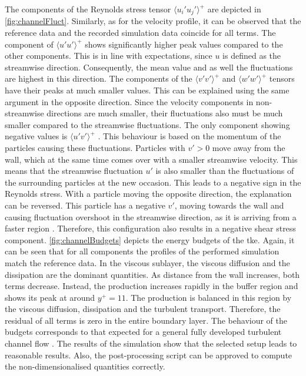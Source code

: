 The components of the Reynolds stress tensor $\langle u_i'u_j'\rangle ^+$ are depicted in \autoref{fig:channelFluct}.
Similarly, as for the velocity profile, it can be observed that the reference data and the recorded simulation data coincide for all terms.
The component of $\langle u'u'\rangle ^+$ shows significantly higher peak values compared to the other components.
This is in line with expectations, since $u$ is defined as the streamwise direction.
Consequently, the mean value and as well the fluctuations are highest in this direction.
The components of the $\langle v'v'\rangle ^+$ and $\langle w'w'\rangle ^+$ tensors have their peaks at much smaller values.
%
This can be explained using the same argument in the opposite direction.
Since the velocity components in non-streamwise directions are much smaller, their fluctuations also must be much smaller compared to the streamwise fluctuations.
The only component showing negative values is $\langle u'v'\rangle ^+$ .
This behaviour is based on the momentum of the particles causing these fluctuations.
Particles with $v' > 0$ move away from the wall, which at the same time comes over with a smaller streamwise velocity. This means that the streamwise fluctuation $u'$ is also smaller than the fluctuations of the surrounding particles at the new occasion.
This leads to a negative sign in the Reynolds stress.
With a particle moving the opposite direction, the explanation can be reversed.
This particle has a negative $v'$, moving towards the wall and causing fluctuation overshoot in the streamwise direction, as it is arriving from a faster region \citep{tennekes_first_1972}.
Therefore, this configuration also results in a negative shear stress component.
\autoref{fig:channelBudgets} depicts the energy budgets of the \acrshort{tke}.
Again, it can be seen that for all components the profiles of the performed simulation match the reference data.
In the viscous sublayer, the viscous diffusion and the dissipation are the dominant quantities.
As distance from the wall increases, both terms decrease.
Instead, the production increases rapidly in the buffer region and shows its peak at around $y ^+ = 11$.
The production is balanced in this region by the viscous diffusion, dissipation and the turbulent transport.
Therefore, the residual of all terms is zero in the entire boundary layer.
The behaviour of the budgets corresponds to that expected for a general fully developed turbulent channel flow \citep{mansour_reynolds-stress_1988}.
The results of the simulation show that the selected setup leads to reasonable results.
Also, the post-processing script can be approved to compute the non-dimensionalised quantities correctly.



